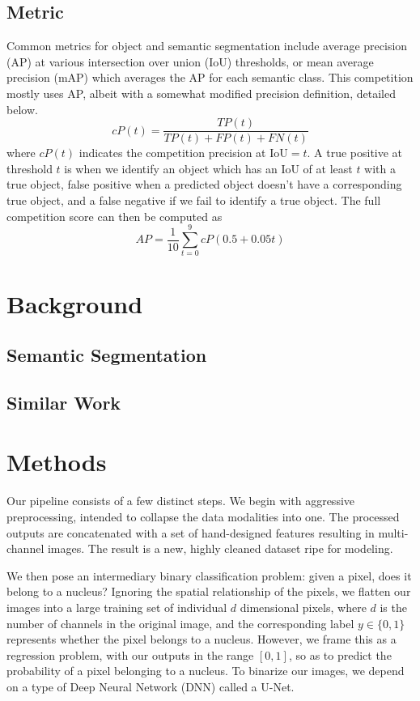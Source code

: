 \documentclass[paper=letter, fontsize=12pt]{article}
\numberwithin{equation}{section} %
\numberwithin{figure}{section} %
\numberwithin{table}{section} %
\begin{document}
\subsection{Metric}

Common metrics for object and semantic segmentation include average precision
(AP) at various intersection over union (IoU) thresholds, or mean average
precision (mAP) which averages the AP for each semantic class.  This
competition mostly uses AP, albeit with a somewhat modified precision
definition, detailed below.
\begin{equation}
    cP(t) = \frac{TP(t)}{TP(t) + FP(t) + FN(t)}
\end{equation}
where $cP(t)$ indicates the competition precision at $\text{IoU}=t$.  A true
positive at threshold $t$ is when we identify an object which has an IoU of at
least $t$ with a true object, false positive when a predicted object doesn't
have a corresponding true object, and a false negative if we fail to identify a
true object.  The full competition score can then be computed as
\begin{equation}
    AP = \frac{1}{10}\sum_{t = 0}^{9} cP(0.5 + 0.05t)
\end{equation}

\section{Background}

\subsection{Semantic Segmentation}

\subsection{Similar Work}

\section{Methods}

Our pipeline consists of a few distinct steps.  We begin with aggressive
preprocessing, intended to collapse the data modalities into one.  The
processed outputs are concatenated with a set of hand-designed features
resulting in multi-channel images.  The result is a new, highly cleaned dataset
ripe for modeling.

We then pose an intermediary binary classification problem: given a pixel, does
it belong to a nucleus?  Ignoring the spatial relationship of the pixels, we
flatten our images into a large training set of individual $d$ dimensional
pixels, where $d$ is the number of channels in the original image, and the
corresponding label $y \in \{0, 1\}$ represents whether the pixel belongs to a
nucleus.  However, we frame this as a regression problem, with our outputs in
the range $[0, 1]$, so as to predict the probability of a pixel belonging to a
nucleus.  To binarize our images, we depend on a type of Deep Neural Network
(DNN) called a U-Net.
\end{document}
